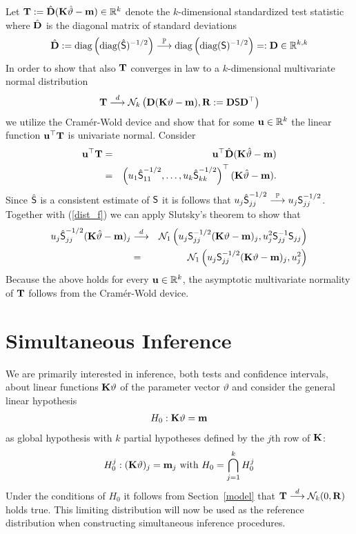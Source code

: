 \documentclass[12pt]{article}
\begin{document}
Let $\T := \hat{\D} (\K \hat{\vartheta} - \m) \in \R^k$ denote
the $k$-dimensional standardized test statistic where $\hat{\D}$ is the diagonal
matrix of standard deviations
\begin{eqnarray*}
\hat{\D} := \text{diag}\left(\text{diag}(\hat{\S})^{-1/2}\right) \cP 
\text{diag}\left(\text{diag}(\S)^{-1/2}\right) =: \D \in \R^{k,k}
\end{eqnarray*}
In order to show that also $\T$ converges in law to a $k$-dimensional multivariate
normal distribution
\begin{eqnarray*}
\T \cL \N_k\left(\D(\K \vartheta - \m), \Cor := \D \S \D^\top\right)
\end{eqnarray*}
we utilize the Cram{\'e}r-Wold device and show that for some $\uu \in \R^k$ 
the linear function $\uu^\top \T$ is univariate normal. Consider
\begin{eqnarray*}
\uu^\top \T & = & \uu^\top \hat{\D} (\K \hat{\vartheta} - \m) \\
& = & \left(u_1 \hat{\S}_{11}^{-1/2}, \dots, u_k \hat{\S}_{kk}^{-1/2}\right)^\top(\K \hat{\vartheta} - \m).
\end{eqnarray*}
Since $\hat{\S}$ is a consistent estimate of $\S$ it 
is follows that $u_j \hat{\S}_{jj}^{-1/2} \cP u_j \S_{jj}^{-1/2}$.
Together with (\ref{dist_f}) we can apply Slutsky's theorem to show that
\begin{eqnarray*}
u_j \hat{\S}_{jj}^{-1/2} (\K \hat{\vartheta} - \m)_j & \cL &  
\N_1\left(u_j \S_{jj}^{-1/2} (\K \vartheta - \m)_j, u_j^2 \S_{jj}^{-1} \S_{jj}\right) \\
& = & \N_1\left(u_j \S_{jj}^{-1/2} (\K \vartheta - \m)_j, u_j^2\right)
\end{eqnarray*}
Because the above holds for every $\uu \in \R^k$, the asymptotic multivariate
normality of $\T$ follows from the Cram{\'e}r-Wold device. 


\section{Simultaneous Inference} \label{siminf}

We are primarily interested in inference, both tests and confidence
intervals, about linear functions $\K \vartheta$ of the parameter vector
$\vartheta$ and consider the general linear hypothesis \citep{Searle1971}
\begin{eqnarray*}
H_0: \K \vartheta = \m
\end{eqnarray*}
as global hypothesis with $k$ partial hypotheses defined by the
$j$th row of $\K$:
\begin{eqnarray*}
H_0^j: (\K\vartheta)_j = \m_j \text{ with } H_0 = \bigcap_{j = 1}^k H_0^j
\end{eqnarray*}
Under the conditions of $H_0$ it follows from Section~\ref{model} that 
$\T \cL \N_k(0, \Cor)$ holds true. This limiting distribution
will now be used as the reference distribution when constructing
simultaneous inference procedures.
\end{document}
